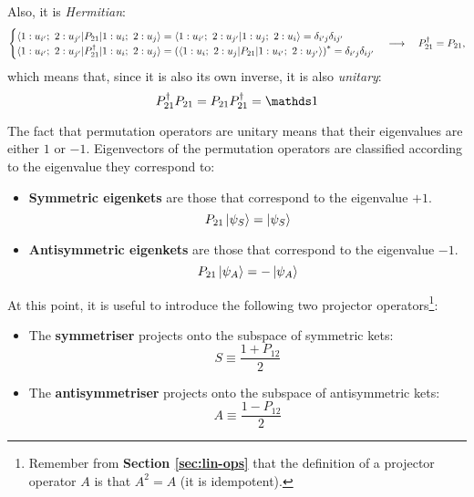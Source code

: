 Also, it is \textit{Hermitian}:
\begin{equation}
    \begin{cases}
        \braket{1:u_{i'};\ 2:u_{j'}| P_{21} | 1:u_i ;\ 2: u_j} = \braket{1:u_{i'};\ 2:u_{j'}| 1:u_j ;\ 2: u_i} = \delta_{i'j}\delta_{ij'}\\ 
        \braket{1:u_{i'};\ 2:u_{j'}| P_{21}^\dagger | 1:u_i ;\ 2: u_j} = \left(\braket{1:u_i ;\ 2: u_j| P_{21} | 1:u_{i'};\ 2:u_{j'}}\right)^* = \delta_{i'j}\delta_{ij'}\\ 
    \end{cases} \longrightarrow\quad  P_{21}^\dagger = P_{21},
\end{equation}
which means that, since it is also its own inverse, it is also \textit{unitary}:
\begin{equation}
    P_{21}^\dagger P_{21} = P_{21}P_{21}^\dagger = \Imat
\end{equation}

The fact that permutation operators are unitary means that their eigenvalues are either $1$ or $-1$. Eigenvectors of the permutation operators are classified according to the eigenvalue they correspond to:
\begin{itemize}
    \item \textbf{Symmetric eigenkets} are those that correspond to the eigenvalue $+1$.
    \begin{equation}
        P_{21}\ket{\psi_S} = \ket{\psi_S}
    \end{equation}
    \item \textbf{Antisymmetric eigenkets} are those that correspond to the eigenvalue $-1$.
    \begin{equation}
        P_{21}\ket{\psi_A} = -\ket{\psi_A}
    \end{equation}
\end{itemize}

At this point, it is useful to introduce the following two projector operators\footnote{Remember from \textbf{Section \ref{sec:lin-ops}} that the definition of a projector operator $A$ is that $A^2 = A$ (it is idempotent).}:
\begin{itemize}
    \item The \textbf{symmetriser} projects onto the subspace of symmetric  kets:
    \begin{equation}
        S\equiv \frac{1 + P_{12}}{2}
    \end{equation}
    \item The \textbf{antisymmetriser} projects onto the subspace of antisymmetric  kets:
    \begin{equation}
        A\equiv\frac{1-P_{12}}{2}
    \end{equation}
\end{itemize}

